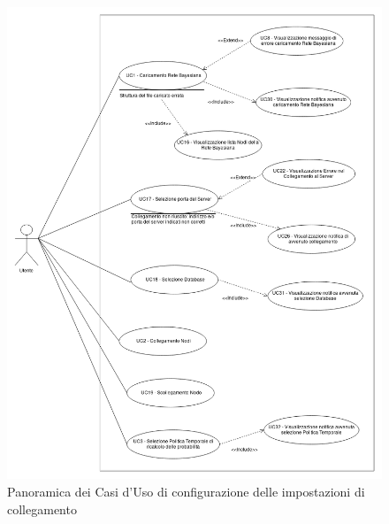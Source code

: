 \begin{figure}[H]
	\begin{center}
		\includegraphics[scale=0.4]{./images/VistaUC.png}
		 \caption{Panoramica dei Casi d'Uso di configurazione delle impostazioni di collegamento}
		 \label{Panoramica UC Configurazione}
	\end{center}
\end{figure}

\pagebreak

